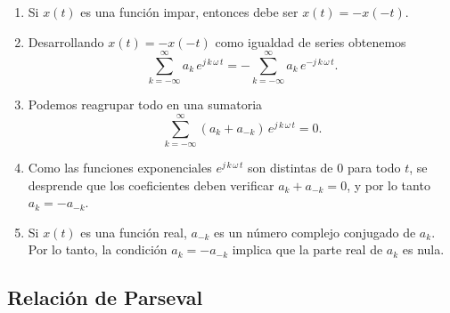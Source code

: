 \begin{enumerate}

\item Si $x(t)$ es una funci\'{o}n impar, entonces debe ser $x(t) = -x(-t)$.

\item Desarrollando $x(t) = -x(-t)$ como igualdad de series obtenemos 
\begin{equation}
   \sum_{k=-\infty}^{\infty} a_{k} \, e^{j \, k \,
    \omega \, t} = -\sum_{k=-\infty}^{\infty} a_{k} \, e^{-j \, k \,
    \omega \, t}.
\end{equation}

\item Podemos reagrupar todo en una sumatoria
\begin{equation}
  \sum_{k=-\infty}^{\infty} \left(a_{k} + a_{-k}\right)\, 
e^{j \, k \, \omega \, t} = 0.
\end{equation}

\item Como las funciones exponenciales $e^{j \, k \, \omega \, t}$
  son distintas de $0$ para todo $t$, se desprende que 
  los coeficientes deben verificar $a_{k} + a_{-k} = 0$,
  y por lo tanto $a_{k} = -a_{-k}$.

\item Si $x(t)$ es una funci\'{o}n real, $a_{-k}$ es un n\'{u}mero complejo conjugado de $a_{k}$.
Por lo tanto, la condici\'{o}n $a_{k} = -a_{-k}$ implica que la parte real de $a_{k}$ es nula.

\end{enumerate}

\subsection{Relaci\'{o}n de Parseval}


